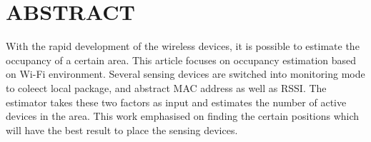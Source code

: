 %
%
%

\chapter*{ABSTRACT}

\pagestyle{plain} %
\setcounter{page}{2}

\indent With the rapid development of the wireless devices, it is possible to estimate the occupancy of a certain area. This article focuses on occupancy estimation based on Wi-Fi environment. Several sensing devices are switched into monitoring mode to coleect local package, and abstract MAC address as well as RSSI. The estimator takes these two factors as input and estimates the number of active devices in the area. This work emphasised on finding the certain positions which will have the best result to place the sensing devices.


\pagebreak{}

